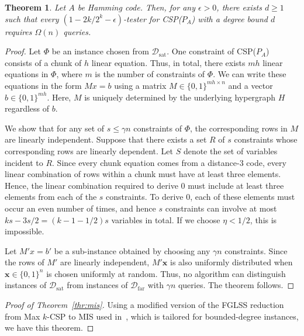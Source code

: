 \documentclass[letterpaper,11pt]{article}
\newtheorem{theorem}{Theorem}[section]
\newcommand{\caldsat}{\mathcal{D}_{\mathrm{sat}}}
\newcommand{\caldfar}{\mathcal{D}_{\mathrm{far}}}
\newcommand{\bfx}{\mathbf{x}}
\newcommand{\bit}{\{0,1\}}
\newcommand{\mis}{\textsf{MIS}\xspace}
\newcommand{\csp}[1]{\textsf{CSP}(#1)\xspace}
\newcommand{\maxkcsp}{\textsf{Max $k$-CSP}\xspace}
\begin{document}
\begin{theorem}\label{thr:generator-hardness}
  Let $A$ be Hamming code.
  Then, for any $\epsilon>0$, 
  there exists $d\geq 1$ such that every $(1-2k/2^k-\epsilon)$-tester for \csp{$P_A$} with a degree bound $d$ requires $\Omega(n)$ queries.
\end{theorem}
\begin{proof}
  Let $\Phi$ be an instance chosen from $\caldsat$.
  One constraint of \csp{$P_A$} consists of a chunk of $h$ linear equation.
  Thus, in total, there exists $mh$ linear equations in $\Phi$,
  where $m$ is the number of constraints of $\Phi$.
  We can write these equations in the form $Mx = b$ using a matrix $M \in \bit^{mh \times n}$ and a vector $b \in \bit^{mh}$.
  Here, $M$ is uniquely determined by the underlying hypergraph $H$ regardless of $b$.

  We show that for any set of $s\leq \gamma n$ constraints of $\Phi$, 
  the corresponding rows in $M$ are linearly independent.
  Suppose that there exists a set $R$ of $s$ constraints whose corresponding rows are linearly dependent.
  Let $S$ denote the set of variables incident to $R$.
  Since every chunk equation comes from a distance-$3$ code, every linear combination of rows within a chunk must have at least three elements.
  Hence, the linear combination required to derive $0$ must include at least three elements from each of the $s$ constraints.
  To derive $0$, each of these elements must occur an even number of times,
  and hence $s$ constraints can involve at most $ks-3s/2=(k-1-1/2)s$ variables in total.
  If we choose $\eta<1/2$, this is impossible.

  Let $M'x=b'$ be a sub-instance obtained by choosing any $\gamma n$ constraints.
  Since the rows of $M'$ are linearly independent, $M'\bfx$ is also uniformly distributed when $\bfx\in \bit^{n}$ is chosen uniformly at random.
  Thus, no algorithm can distinguish instances of $\caldsat$ from instances of $\caldfar$ with $\gamma n$ queries.
  The theorem follows.
\end{proof}

\begin{proof}[Proof of Theorem~\ref{thr:mis}]
Using a modified version of the FGLSS reduction from \maxkcsp to \mis used in~\cite{Tre01}, 
which is tailored for bounded-degree instances,
we have this theorem.
\end{proof}
\end{document}
